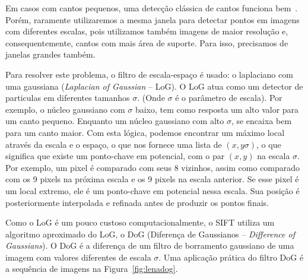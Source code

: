 Em casos com cantos pequenos, uma detecção clássica de cantos funciona
bem~\cite{Harris:Stephens:Edge:Corner:Step}. Porém, raramente
utilizaremos a mesma janela para detectar pontos em imagens com
diferentes escalas, pois utilizamos também imagens de maior resolução e, consequentemente, cantos
com mais área de suporte. Para isso, precisamos de janelas grandes também. 

Para resolver este problema, o filtro de escala-espaço é usado: o laplaciano
com uma gaussiana (\emph{Laplacian of Gaussian} --  LoG). O LoG atua como um detector de
particulas em diferentes tamanhos $\sigma$. (Onde $\sigma$ é o parâmetro de
escala). Por exemplo, o núcleo gaussiano com $\sigma$ baixo, tem como resposta
um alto valor para um canto pequeno. Enquanto um núcleo gaussiano com alto
$\sigma$, se encaixa bem para um canto maior. Com esta lógica, podemos encontrar
um máximo local através da escala e o espaço, o que nos fornece uma lista de
$(x,y \sigma)$, o que significa que existe um ponto-chave em potencial, com o
par $(x,y)$ na escala $\sigma$.  Por exemplo, um pixel é comparado com seus 8 vizinhos, assim
como comparado com os 9 pixels na próxima escala e os 9 pixels na escala
anterior. Se esse pixel é um local extremo, ele é um ponto-chave em potencial
nessa escala. Sua posição é posteriormente interpolada e refinada antes de
produzir os pontos finais.



Como o LoG é um pouco custoso computacionalmente, o SIFT utiliza um
algoritmo aproximado do LoG, o DoG (Diferença de Gaussianos -- \emph{Difference
of Gaussians}). O DoG é a diferença de um filtro de borramento gaussiano de uma imagem com
valores diferentes de escala $\sigma$.
Uma aplicação prática do filtro DoG é a sequência de imagens na
Figura~\ref{fig:lenadog}.

